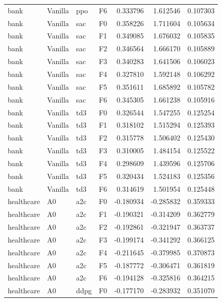 \begin{tabular}{llllrrr}
      bank & Vanilla &       ppo &  F6 &  0.333796 &  1.612546 &  0.107303 \\
      bank & Vanilla &       sac &  F0 &  0.358226 &  1.711604 &  0.105634 \\
      bank & Vanilla &       sac &  F1 &  0.349085 &  1.676032 &  0.105835 \\
      bank & Vanilla &       sac &  F2 &  0.346564 &  1.666170 &  0.105889 \\
      bank & Vanilla &       sac &  F3 &  0.340283 &  1.641506 &  0.106023 \\
      bank & Vanilla &       sac &  F4 &  0.327810 &  1.592148 &  0.106292 \\
      bank & Vanilla &       sac &  F5 &  0.351611 &  1.685892 &  0.105782 \\
      bank & Vanilla &       sac &  F6 &  0.345305 &  1.661238 &  0.105916 \\
      bank & Vanilla &       td3 &  F0 &  0.326544 &  1.547255 &  0.125254 \\
      bank & Vanilla &       td3 &  F1 &  0.318102 &  1.515294 &  0.125393 \\
      bank & Vanilla &       td3 &  F2 &  0.315778 &  1.506402 &  0.125430 \\
      bank & Vanilla &       td3 &  F3 &  0.310005 &  1.484154 &  0.125522 \\
      bank & Vanilla &       td3 &  F4 &  0.298609 &  1.439596 &  0.125706 \\
      bank & Vanilla &       td3 &  F5 &  0.320434 &  1.524183 &  0.125356 \\
      bank & Vanilla &       td3 &  F6 &  0.314619 &  1.501954 &  0.125448 \\
healthcare &      A0 &       a2c &  F0 & -0.180934 & -0.285832 &  0.359333 \\
healthcare &      A0 &       a2c &  F1 & -0.190321 & -0.314209 &  0.362779 \\
healthcare &      A0 &       a2c &  F2 & -0.192861 & -0.321947 &  0.363737 \\
healthcare &      A0 &       a2c &  F3 & -0.199174 & -0.341292 &  0.366125 \\
healthcare &      A0 &       a2c &  F4 & -0.211645 & -0.379985 &  0.370873 \\
healthcare &      A0 &       a2c &  F5 & -0.187772 & -0.306471 &  0.361819 \\
healthcare &      A0 &       a2c &  F6 & -0.194128 & -0.325816 &  0.364215 \\
healthcare &      A0 &      ddpg &  F0 & -0.177170 & -0.283932 &  0.351070 \\

\end{tabular}
